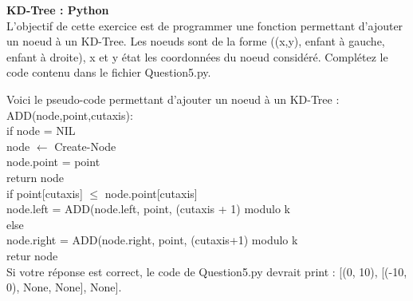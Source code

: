 \begin{Exercice}[15 minutes]\textbf{KD-Tree : Python}\\

L'objectif de cette exercice est de programmer une fonction permettant d'ajouter un noeud à un KD-Tree. Les noeuds sont de la forme ((x,y), enfant à gauche, enfant à droite), x et y état les coordonnées du noeud considéré. Complétez le code contenu dans le fichier Question5.py.\\

\begin{conseil}
Voici le pseudo-code permettant d'ajouter un noeud à un KD-Tree :\\

ADD(node,point,cutaxis):\\
    \tabto{1cm}if node = NIL\\
        \tabto{2cm}node $\leftarrow$ Create-Node\\
        \tabto{2cm}node.point = point\\
        \tabto{2cm}return node\\
    \tabto{1cm}if point[cutaxis] $\leq$ node.point[cutaxis]\\
    \tabto{2cm} node.left = ADD(node.left, point, (cutaxis + 1) modulo k\\
    \tabto{1cm} else\\
    \tabto{2cm} node.right = ADD(node.right, point, (cutaxis+1) modulo k\\
    \tabto{1cm} retur node\\
    
    Si votre réponse est correct, le code de Question5.py devrait print : [(0, 10), [(-10, 0), None, None], None].
\end{conseil}

\end{Exercice}

